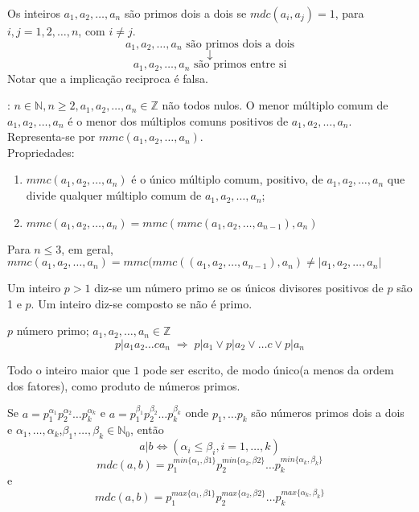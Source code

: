\begin{definicao}
Os inteiros $a_1,a_2,\dotsc,a_n$ são primos dois a dois se $mdc(a_i,a_j)=1$, para $i,j=1,2,\dotsc,n$, com $i \neq j$.
$$a_1,a_2,\dotsc,a_n \text{ são primos dois a dois}$$
$$\downarrow $$
$$a_1,a_2,\dotsc,a_n \text{ são primos entre si}$$
Notar que a implicação reciproca é falsa.
\end{definicao}

\begin{definicao}: $n \in \mathbb{N},n \ge 2,a_1,a_2,\dotsc,a_n \in \mathbb{Z}$ não todos nulos. O menor múltiplo comum de $a_1,a_2,\dotsc,a_n$ é o menor dos múltiplos comuns positivos de $a_1,a_2,\dotsc,a_n$. Representa-se por \linebreak $mmc(a_1,a_2,\dotsc,a_n)$.\\

Propriedades:
\begin{enumerate}
    \item $mmc(a_1,a_2,\dotsc,a_n)$ é o único múltiplo comum, positivo, de $a_1,a_2,\dotsc,a_n$ que divide qualquer múltiplo comum de $a_1,a_2,\dotsc,a_n$;
    \item $mmc(a_1,a_2,\dotsc,a_n)=mmc(mmc(a_1,a_2,\dotsc,a_{n-1}),a_n)$
\end{enumerate}
Para $n \leq 3$, em geral,\\$mmc(a_1,a_2,\dotsc,a_n)=mmc(mmc((a_1,a_2,\dotsc,a_{n-1}),a_n) \neq |a_1,a_2,\dotsc,a_n|$
\end{definicao}

\begin{definicao} Um inteiro $p>1$ diz-se um número primo se os únicos divisores positivos de $p$ são 1 e $p$.
Um inteiro diz-se composto se não é primo.
\end{definicao}

\begin{teorema} $p$ número primo; $a_1,a_2,\dotsc,a_n \in \mathbb{Z}$ $$p|a_1a_2\dots ca_n\;\Rightarrow \;p|a_1 \lor p|a_2\lor \dots c \lor p|a_n$$
\end{teorema}

\begin{teorema} Todo o inteiro maior que $1$ pode ser escrito, de modo único(a menos da ordem dos fatores), como produto de números primos.
\end{teorema}

\begin{teorema} Se $a=p_1^{\alpha_1}p_2^{\alpha_2}\dotsc p_k^{\alpha_k}$ e $a=p_1^{\beta_1}p_2^{\beta_2}\dotsc p_k^{\beta_k}$ onde $p_1,\dotsc p_k$ são números primos dois a dois e $\alpha_1,\dotsc,\alpha_k$,$\beta_1,\dotsc,\beta_k \in \mathbb{N}_0$, então  $$a|b \Leftrightarrow(\alpha_i \leq \beta_i,i=1,\dotsc,k)$$
$$mdc(a,b)=p_1^{min\{\alpha_1,\beta1\}}p_2^{min\{\alpha_2,\beta2\}}\dotsc p_k^{min\{\alpha_k,\beta_k\}}$$
e
$$mdc(a,b)=p_1^{max\{\alpha_1,\beta1\}}p_2^{max\{\alpha_2,\beta2\}}\dotsc p_k^{max\{\alpha_k,\beta_k\}}$$
\end{teorema}

